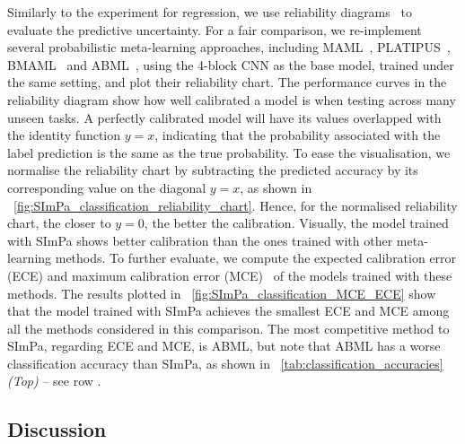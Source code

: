         Similarly to the experiment for regression, we use reliability diagrams~\cite{guo2017oncalibration} to evaluate the predictive uncertainty. For a fair comparison, we re-implement several probabilistic meta-learning approaches, including MAML~\cite{finn2017model}, PLATIPUS~\cite{finn2018probabilistic}, BMAML~\cite{yoon2018bayesian} and ABML~\cite{ravi2018amortized}, using the 4-block CNN as the base model, trained under the same setting, and plot their reliability chart. The performance curves in the reliability diagram show how well calibrated a model is when testing across many unseen tasks. A perfectly calibrated model will have its values overlapped with the identity function \(y=x\), indicating that the probability associated with the label prediction is the same as the true probability. To ease the visualisation, we normalise the reliability chart by subtracting the predicted accuracy by its corresponding value on the diagonal \(y=x\), as shown in \figureautorefname~\ref{fig:SImPa_classification_reliability_chart}. Hence, for the normalised reliability chart, the closer to \(y=0\), the better the calibration. Visually, the model trained with SImPa shows better calibration than the ones trained with other meta-learning methods. To further evaluate, we compute the expected calibration error (ECE) and maximum calibration error (MCE)~\cite{guo2017oncalibration} of the models trained with these methods. The results plotted in \figureautorefname~\ref{fig:SImPa_classification_MCE_ECE} show that the model trained with SImPa achieves the smallest ECE and MCE among all the methods considered in this comparison.  The most competitive method to SImPa, regarding ECE and MCE, is ABML, but note that ABML has a worse classification accuracy than SImPa, as shown in \tableautorefname~\ref{tab:classification_accuracies} \emph{(Top)} -- see row .

    \subsection{Discussion}

